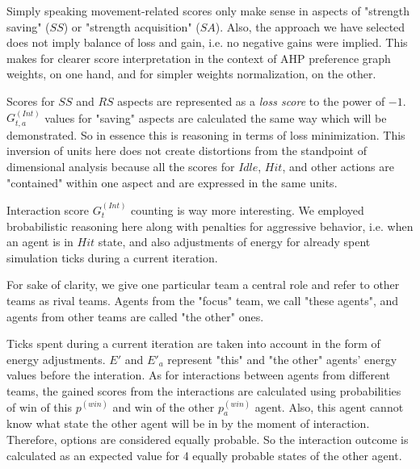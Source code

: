 Simply speaking movement-related scores only make sense in aspects of "strength saving" ($SS$) or "strength acquisition"
($SA$). Also, the approach we have selected does not imply balance of loss and gain, i.e. no negative gains were
implied. This makes for clearer score interpretation in the context of AHP preference graph weights, on one hand, and
for simpler weights normalization, on the other.

Scores for $SS$ and $RS$ aspects are represented as a \textit{loss score} to the power of $-1$. $G_{t,a}^{(Int)}$ values
for "saving" aspects are calculated the same way which will be demonstrated. So in essence this is reasoning in terms of
loss minimization. This inversion of units here does not create distortions from the standpoint of dimensional analysis
because all the scores for $Idle$, $Hit$, and other actions are "contained" within one aspect and are expressed in the
same units.

Interaction score $G_t^{(Int)}$ counting is way more interesting. We employed brobabilistic reasoning here along with
penalties for aggressive behavior, i.e. when an agent is in $Hit$ state, and also adjustments of energy for already
spent simulation ticks during a current iteration.

For sake of clarity, we give one particular team a central role and refer to other teams as rival teams. Agents from the
"focus" team, we call "these agents", and agents from other teams are called "the other" ones.

Ticks spent during a current iteration are taken into account in the form of energy adjustments. $E'$ and $E'_a$
represent "this" and "the other" agents' energy values before the interation. As for interactions between agents from
different teams, the gained scores from the interactions are calculated using probabilities of win of this $p^{(win)}$
and win of the other $p^{(win)}_a$ agent. Also, this agent cannot know what state the other agent will be in by the
moment of interaction. Therefore, options are considered equally probable. So the interaction outcome is calculated as
an expected value for 4 equally probable states of the other agent.

